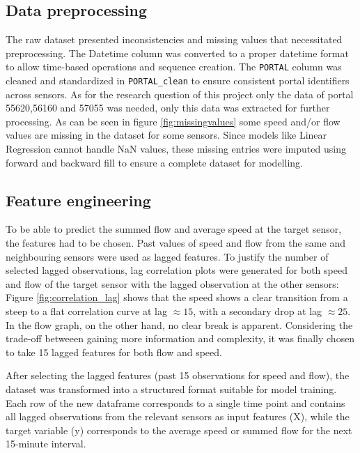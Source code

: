 	\subsection{Data preprocessing} \label{chap:dataprepro}
	The raw dataset presented inconsistencies and missing values that necessitated preprocessing.
	The Datetime column was converted to a proper datetime format to allow time-based operations and sequence creation. The \texttt{PORTAL} column was cleaned and standardized in \texttt{PORTAL\_clean} to ensure consistent portal identifiers across sensors.\newline 
	As for the research question of this project only the data of portal 55620,56160 and 57055 was needed, only this data was extracted for further processing. \newline 
	As can be seen in figure \ref{fig:missingvalues} some speed and/or flow values are missing in the dataset for some sensors. Since models like Linear Regression cannot handle NaN values, these missing entries were imputed using forward and backward fill to ensure a complete dataset for modelling.
	\subsection{Feature engineering}
	To be able to predict the summed flow and average speed at the target sensor, the features had to be chosen. Past values of speed and flow from the same and neighbouring sensors were used as lagged features.
	To justify the number of selected lagged observations, lag correlation  plots were generated for both speed and flow of the target sensor with the lagged observation at the other sensors:
	Figure \ref{fig:correlation_lag} shows that the speed shows a clear transition from a steep to a flat correlation curve at lag $\approx  15$, with a secondary drop at lag $\approx 25$.
	In the flow graph, on the other hand, no clear break is apparent.
	Considering the trade-off betweeen gaining more information and complexity, it was finally chosen to take 15 lagged features for both flow and speed.

	\noindent After selecting the lagged features (past 15 observations for speed and flow), the dataset was transformed into a structured format suitable for model training. Each row of the new dataframe corresponds to a single time point and contains all lagged observations from the relevant sensors as input features (X), while the target variable (y) corresponds to the average speed or summed flow for the next 15-minute interval. 
